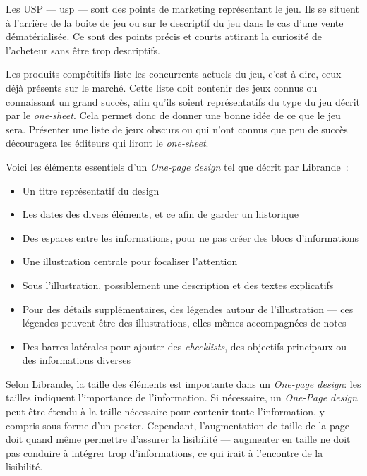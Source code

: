 
Les USP --- \gls{usp} --- sont des points de marketing représentant le jeu. Ils se situent à l'arrière de la boite de jeu ou sur le descriptif du jeu dans le cas d'une vente dématérialisée. Ce sont des points précis et courts attirant la curiosité de l'acheteur sans être trop descriptifs. 



Les produits compétitifs liste les concurrents actuels du jeu, c'est-\`a-dire, ceux déjà présents sur le marché.  
Cette liste doit contenir des jeux connus ou connaissant un grand succès, afin qu'ils soient représentatifs du type du jeu d\'ecrit par le \emph{one-sheet}. Cela permet donc de donner une bonne idée de ce que le jeu sera. 
Présenter une liste de jeux obscurs ou qui n'ont connus que peu de succès découragera les éditeurs qui liront le \emph{one-sheet}.



Voici les éléments essentiels d'un \emph{One-page design} tel que d\'ecrit par Librande~\cite{onepage_librande}:
\begin{itemize}
    \item Un titre représentatif du design
    \item Les dates des divers éléments, et ce afin de garder un historique
    \item Des espaces entre les informations, pour ne pas créer des blocs d'informations
    \item Une illustration centrale pour focaliser l'attention
    \item Sous l'illustration, possiblement une description et des textes explicatifs
    \item Pour des détails supplémentaires, des légendes autour de l'illustration ---
     ces légendes peuvent être des illustrations, elles-mêmes accompagnées de notes
    \item Des barres latérales pour ajouter des \emph{checklists}, des objectifs principaux ou des informations diverses
\end{itemize}

Selon Librande, la taille des éléments est importante dans un \emph{One-page design}: les tailles indiquent l'importance de l'information. Si nécessaire, un \emph{One-Page design} peut être étendu à la taille nécessaire pour contenir toute l'information, y compris sous forme d'un poster.
Cependant, l'augmentation de taille de la page doit quand même permettre d'assurer la lisibilité --- augmenter en taille ne doit pas conduire à intégrer trop d'informations, ce qui irait à l'encontre de la lisibilité.



